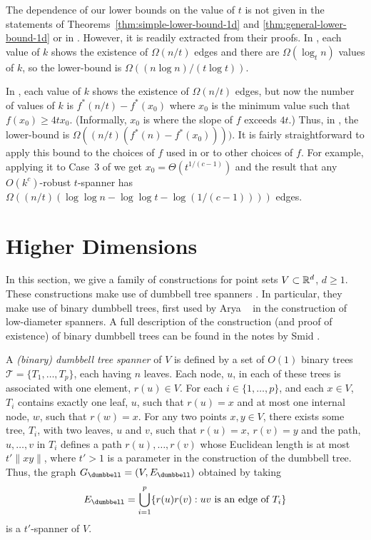 \documentclass{patmorin}
\begin{document}
\begin{rem}
  The dependence of our lower bounds on the value of $t$ is not
  given in the statements of Theorems~\ref{thm:simple-lower-bound-1d}
  and \ref{thm:general-lower-bound-1d} or in .
  However, it is readily extracted from their proofs.  In
  , each value of $k$ shows the existence
  of $\Omega(n/t)$ edges and there are $\Omega(\log_t n)$ values of $k$,
  so the lower-bound is $\Omega((n\log n)/(t\log t))$.

  In , each value of $k$ shows the
  existence of $\Omega(n/t)$ edges, but now the number of values of $k$
  is $f^*(n/t) - f^*(x_0)$ where $x_0$ is the minimum value such that
  $f(x_0)\ge 4tx_0$. (Informally, $x_0$ is where the slope of $f$ exceeds
  $4t$.)  Thus, in , the lower-bound is
  $\Omega((n/t)(f^*(n)-f^*(x_0))))$.  It is fairly straightforward to
  apply this bound to the choices of $f$ used in 
  or to other choices of $f$.  For example, applying it to Case~3 of
   we get $x_0=\Theta(t^{1/(c-1)})$ and the result
  that any $O(k^c)$-robust $t$-spanner has $\Omega((n/t)(\log\log n -
  \log\log t - \log (1/(c-1))))$ edges.
\end{rem}


\section{Higher Dimensions}

In this section, we give a family of constructions for point sets
$V\subset\mathbb{R}^d$, $d\ge 1$.  These constructions make use of dumbbell
tree spanners \cite[Chapter~11]{ns07}.  In particular, they make use
of binary dumbbell trees, first used by Arya \etal\ \cite{admss95} in
the construction of low-diameter spanners.  A full description of the
construction (and proof of existence) of binary dumbbell trees can be
found in the notes by Smid \cite{s12}.

A \emph{(binary) dumbbell tree spanner} of $V$ is defined by a set of
$O(1)$ binary trees $\mathcal{T}=\{T_1,\ldots,T_p\}$, each having $n$
leaves.  Each node, $u$, in each of these trees is associated with one
element, $r(u)\in V$.  For each $i\in\{1,\ldots,p\}$, and each $x\in V$,
$T_i$ contains exactly one leaf, $u$, such that $r(u)=x$ and at most
one internal node, $w$, such that $r(w)=x$.
For any two points $x,y\in V$, there exists some tree, $T_i$,
with two leaves, $u$ and $v$, such that $r(u)=x$, $r(v)=y$ and
the path, $u,\ldots,v$ in $T_i$ defines a path $r(u),\ldots,r(v)$
whose Euclidean length is at most $t'\|xy\|$, where $t'>1$ is a
parameter in the construction of the dumbbell tree.  Thus, the graph
$G_\dumbbell=(V,E_\dumbbell)$ obtained by taking
\[
   E_\dumbbell = \bigcup_{i=1}^p\{r(u)r(v) : \text{$uv$ is an edge of $T_i$} \}
\]
is a $t'$-spanner of $V$.  
\end{document}

